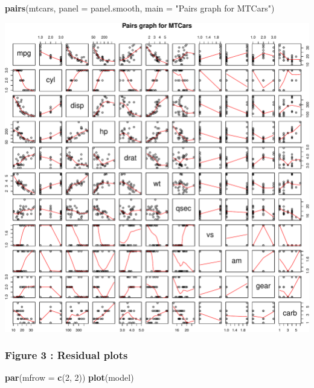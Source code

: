 \documentclass[a3paper]{article}
\newenvironment{Shaded}{\begin{snugshade}}{\end{snugshade}}
\newcommand{\KeywordTok}[1]{\textcolor[rgb]{0.13,0.29,0.53}{\textbf{{#1}}}}
\newcommand{\DataTypeTok}[1]{\textcolor[rgb]{0.13,0.29,0.53}{{#1}}}
\newcommand{\DecValTok}[1]{\textcolor[rgb]{0.00,0.00,0.81}{{#1}}}
\newcommand{\StringTok}[1]{\textcolor[rgb]{0.31,0.60,0.02}{{#1}}}
\newcommand{\NormalTok}[1]{{#1}}
\begin{document}
\begin{Shaded}
\begin{Highlighting}[]
\KeywordTok{pairs}\NormalTok{(mtcars, }\DataTypeTok{panel =} \NormalTok{panel.smooth, }\DataTypeTok{main =} \StringTok{"Pairs graph for MTCars"}\NormalTok{)}
\end{Highlighting}
\end{Shaded}

\includegraphics{./Report_files/figure-latex/unnamed-chunk-14.pdf}

\subsubsection{Figure 3 : Residual plots}\label{figure-3-residual-plots}

\begin{Shaded}
\begin{Highlighting}[]
\KeywordTok{par}\NormalTok{(}\DataTypeTok{mfrow =} \KeywordTok{c}\NormalTok{(}\DecValTok{2}\NormalTok{, }\DecValTok{2}\NormalTok{))}
\KeywordTok{plot}\NormalTok{(model)}
\end{Highlighting}
\end{Shaded}
\end{document}
